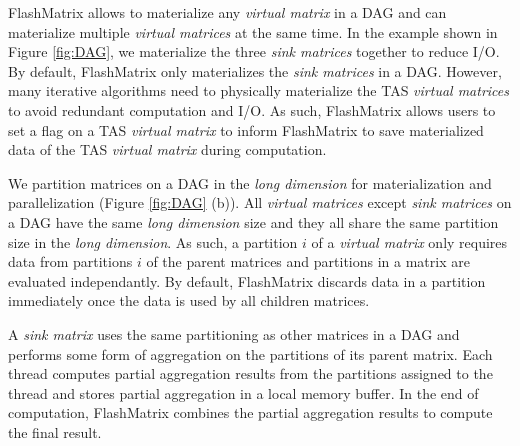 FlashMatrix allows to materialize any \textit{virtual matrix} in a DAG and
can materialize multiple \textit{virtual matrices} at the same time.
In the example shown in Figure \ref{fig:DAG}, we materialize the three
\textit{sink matrices} together to reduce I/O.
By default, FlashMatrix only materializes the \textit{sink matrices} in a DAG.
However, many iterative algorithms need to physically materialize the TAS
\textit{virtual matrices} to avoid redundant computation and I/O. As such,
FlashMatrix allows users to set a flag on a TAS \textit{virtual matrix} to
inform FlashMatrix to save materialized data of the TAS \textit{virtual matrix}
during computation.

We partition matrices on a DAG in the \textit{long dimension} for materialization
and parallelization (Figure \ref{fig:DAG} (b)). All \textit{virtual matrices}
except \textit{sink matrices} on a DAG have the same \textit{long dimension}
size and they all share the same partition size in the \textit{long dimension}.
As such, a partition $i$ of a \textit{virtual matrix} only requires data from
partitions $i$ of the parent matrices and partitions in a matrix are
evaluated independantly. By default, FlashMatrix discards data in a partition
immediately once the data is used by all children matrices.

A \textit{sink matrix} uses the same partitioning as other matrices in a DAG
and performs some form of aggregation on the partitions
of its parent matrix. Each thread computes partial aggregation results from
the partitions assigned to the thread and stores partial
aggregation in a local memory buffer. In the end of computation, FlashMatrix
combines the partial aggregation results to compute the final result.


